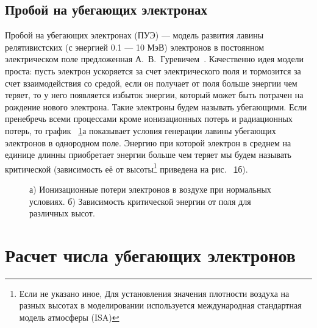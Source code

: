 \subsection{Пробой на убегающих электронах}\label{sec:thunderstorm/gurevich}
%
Пробой на убегающих электронах (ПУЭ) --- модель развития лавины релятивистских (с энергией 0.1 --- 10 МэВ) электронов в постоянном электрическом поле предложенная А.~В.~Гуревичем~\cite{gurevich1992runaway,Gurevich2001ufn}. Качественно идея модели проста: пусть электрон ускоряется за счет электрического поля и тормозится за счет взаимодействия со средой, если он получает от поля больше энергии чем теряет, то у него появляется избыток энергии, который может быть потрачен на рождение нового электрона. Такие электроны будем называть убегающими. Если пренебречь всеми процессами кроме ионизационных потерь и радиационных потерь, то график ~\ref{fig:storm:gurevich}а показывает условия генерации лавины убегающих электронов в однородном поле. Энергию при которой электрон в среднем на единице длинны приобретает энергии больше чем теряет мы будем называть критической (зависимость её от высоты\footnote{Если не указано иное, Для установления значения плотности воздуха на разных высотах в моделировании используется международная стандартная модель атмосферы (ISA)} приведена на рис. ~\ref{fig:storm:gurevich}б).

\begin{figure}[t]
    \begin{center}
        \begin{minipage}[h]{0.49\linewidth}
        \end{minipage}
        \hfill
        \begin{minipage}[h]{0.49\linewidth}
        \end{minipage}
        \caption{а) Ионизационные потери электронов в воздухе при нормальных условиях. б) Зависимость критической энергии от поля для различных высот.}
    \end{center}
    \label{fig:storm:gurevich}
\end{figure}

\section{Расчет числа убегающих электронов}\label{sec:thunderstorm/rrea}

